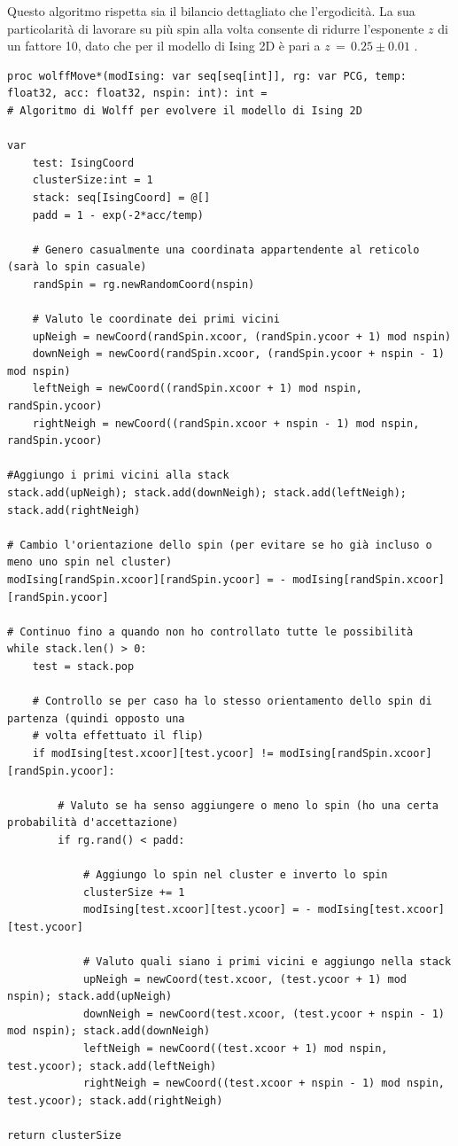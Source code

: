 Questo algoritmo rispetta sia il bilancio dettagliato che l'ergodicità. La sua particolarità di lavorare su più spin alla volta consente di 
ridurre l'esponente $z$ di un fattore 10, dato che per il modello di Ising 2D è pari a $z\,=\,0.25 \pm 0.01$ \cite{MCM}.


\begin{verbatim}
proc wolffMove*(modIsing: var seq[seq[int]], rg: var PCG, temp: float32, acc: float32, nspin: int): int = 
# Algoritmo di Wolff per evolvere il modello di Ising 2D

var 
    test: IsingCoord
    clusterSize:int = 1
    stack: seq[IsingCoord] = @[]
    padd = 1 - exp(-2*acc/temp)

    # Genero casualmente una coordinata appartendente al reticolo (sarà lo spin casuale)
    randSpin = rg.newRandomCoord(nspin)

    # Valuto le coordinate dei primi vicini
    upNeigh = newCoord(randSpin.xcoor, (randSpin.ycoor + 1) mod nspin)
    downNeigh = newCoord(randSpin.xcoor, (randSpin.ycoor + nspin - 1) mod nspin)
    leftNeigh = newCoord((randSpin.xcoor + 1) mod nspin, randSpin.ycoor)
    rightNeigh = newCoord((randSpin.xcoor + nspin - 1) mod nspin, randSpin.ycoor)

#Aggiungo i primi vicini alla stack
stack.add(upNeigh); stack.add(downNeigh); stack.add(leftNeigh); stack.add(rightNeigh)

# Cambio l'orientazione dello spin (per evitare se ho già incluso o meno uno spin nel cluster)
modIsing[randSpin.xcoor][randSpin.ycoor] = - modIsing[randSpin.xcoor][randSpin.ycoor]

# Continuo fino a quando non ho controllato tutte le possibilità
while stack.len() > 0:
    test = stack.pop

    # Controllo se per caso ha lo stesso orientamento dello spin di partenza (quindi opposto una 
    # volta effettuato il flip)
    if modIsing[test.xcoor][test.ycoor] != modIsing[randSpin.xcoor][randSpin.ycoor]:

        # Valuto se ha senso aggiungere o meno lo spin (ho una certa probabilità d'accettazione)
        if rg.rand() < padd:
                
            # Aggiungo lo spin nel cluster e inverto lo spin
            clusterSize += 1
            modIsing[test.xcoor][test.ycoor] = - modIsing[test.xcoor][test.ycoor] 

            # Valuto quali siano i primi vicini e aggiungo nella stack
            upNeigh = newCoord(test.xcoor, (test.ycoor + 1) mod nspin); stack.add(upNeigh)
            downNeigh = newCoord(test.xcoor, (test.ycoor + nspin - 1) mod nspin); stack.add(downNeigh)
            leftNeigh = newCoord((test.xcoor + 1) mod nspin, test.ycoor); stack.add(leftNeigh)
            rightNeigh = newCoord((test.xcoor + nspin - 1) mod nspin, test.ycoor); stack.add(rightNeigh)
    
return clusterSize

\end{verbatim}    
    